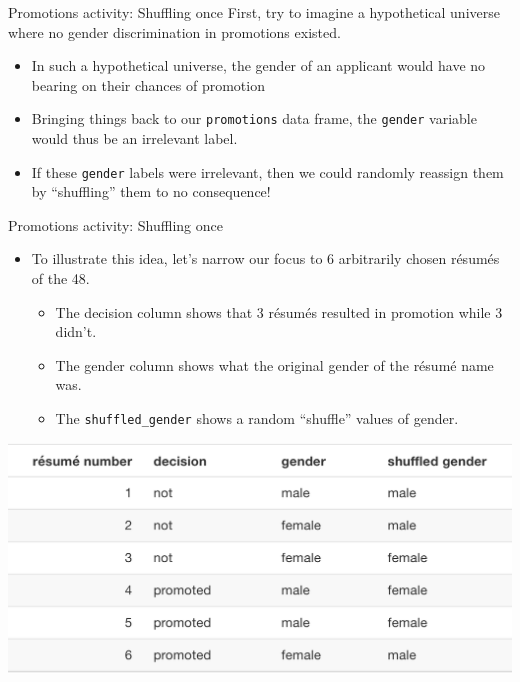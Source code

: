 \documentclass[
  ignorenonframetext,
]{beamer}
\begin{document}
\begin{frame}[fragile]{Promotions activity: Shuffling once}
\protect\hypertarget{promotions-activity-shuffling-once}{}
First, try to imagine a hypothetical universe where no gender
discrimination in promotions existed.

\begin{itemize}
\item
  In such a hypothetical universe, the gender of an applicant would have
  no bearing on their chances of promotion
\item
  Bringing things back to our \texttt{promotions} data frame, the
  \texttt{gender} variable would thus be an irrelevant label.
\item
  If these \texttt{gender} labels were irrelevant, then we could
  randomly reassign them by ``shuffling'' them to no consequence!
\end{itemize}
\end{frame}

\begin{frame}[fragile]{Promotions activity: Shuffling once}
\protect\hypertarget{promotions-activity-shuffling-once-1}{}
\begin{itemize}
\item
  To illustrate this idea, let's narrow our focus to 6 arbitrarily
  chosen résumés of the 48.

  \begin{itemize}
  \item
    The decision column shows that 3 résumés resulted in promotion while
    3 didn't.
  \item
    The gender column shows what the original gender of the résumé name
    was.
  \item
    The \texttt{shuffled\_gender} shows a random ``shuffle'' values of
    gender.
  \end{itemize}
\end{itemize}

\begin{center}\includegraphics[width=0.7\linewidth,height=0.4\textheight]{week12_1} \end{center}
\end{frame}
\end{document}
